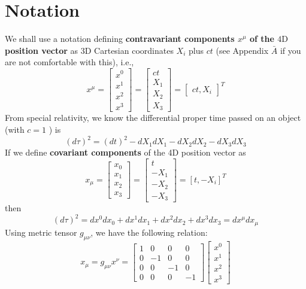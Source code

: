 \section{Notation}
We shall use a notation defining \textbf{contravariant components $x^{\mu}$ of the $4 \mathrm{D}$ position vector} as $3 \mathrm{D}$ Cartesian coordinates $X_{i}$ plus $c t$ (see Appendix $\bar{A}$ if you are not comfortable with this), i.e.,
\begin{equation}
x^{\mu}=\left[\begin{array}{l}
{x^{0}} \\
{x^{1}} \\
{x^{2}} \\
{x^{3}}
\end{array}\right]=\left[\begin{array}{l}
{c t} \\
{X_{1}} \\
{X_{2}} \\
{X_{3}}
\end{array}\right]=\left[\begin{array}{l}
{c t, X_{i}}
\end{array}\right]^{T}
\end{equation}
From special relativity, we know the differential proper time passed on an object (with $c=1$ ) is
\begin{equation}
(d \tau)^{2}=(d t)^{2}-d X_{1} d X_{1}-d X_{2} d X_{2}-d X_{3} d X_{3}
\end{equation}
If we define \textbf{covariant components} of the 4D position vector as
\begin{equation}
x_{\mu}=\left[\begin{array}{l}
{x_{0}} \\
{x_{1}} \\
{x_{2}} \\
{x_{3}}
\end{array}\right]=\left[\begin{array}{c}
{t} \\
{-X_{1}} \\
{-X_{2}} \\
{-X_{3}}
\end{array}\right]=\left[t,-X_{i}\right]^{T}
\end{equation}
then
\begin{equation}
(d \tau)^{2}=d x^{0} d x_{0}+d x^{1} d x_{1}+d x^{2} d x_{2}+d x^{3} d x_{3}=d x^{\mu} d x_{\mu}
\end{equation}
Using metric tensor $g_{\mu\nu}$, we have the following relation:
\begin{equation}
x_{\mu}=g_{\mu \nu} x^{\nu}=\left[\begin{array}{cccc}
{1} & {0} & {0} & {0} \\
{0} & {-1} & {0} & {0} \\
{0} & {0} & {-1} & {0} \\
{0} & {0} & {0} & {-1}
\end{array}\right]\left[\begin{array}{c}
{x^{0}} \\
{x^{1}} \\
{x^{2}} \\
{x^{3}}
\end{array}\right]
\end{equation}
